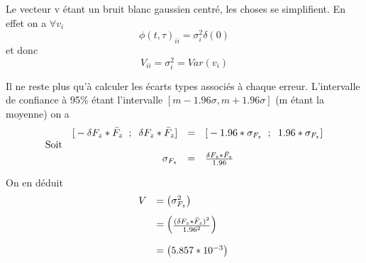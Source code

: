 \documentclass[12pt,twoside,a4paper]{article}
\begin{document}
Le vecteur v étant un bruit blanc gaussien centré, les choses se simplifient. En effet on a $\forall v_{i}$
$$\phi(t,\tau)_{ii} = \sigma_{i}^{2}\delta(0)$$ et donc
$$V_{ii} = \sigma_{i}^{2} = Var(v_{i})$$

Il ne reste plus qu'à calculer les écarts types associés à chaque erreur. L'intervalle de confiance à 95\% étant l'intervalle $[m-1.96\sigma, m+1.96\sigma]$ (m étant la moyenne) on a
$$
\begin{array}{lrcl}
	&\text{[}-\delta F_{z}*\bar{F}_{z} \rule{2mm}{0mm} ; \rule{2mm}{0mm} \delta F_{z}*\bar{F}_{z} \text{]} &=& \text{[} -1.96*\sigma_{F_{z}} \rule{2mm}{0pt}; \rule{2mm}{0pt}1.96*\sigma_{F_{z}}  \text{]} \\
	\text{Soit} & & & \\
	& \sigma_{F_{z}} &=&  \frac{\delta F_{z}*\bar{F}_{z}}{1.96} \\
\end{array}
$$

\vspace{1cm}
On en déduit
$$
\begin{array}{ll}
V &= \begin{pmatrix}
\sigma_{F_{z}}^{2} %
\end{pmatrix} \\
&=  \begin{pmatrix}
\frac{(\delta F_{z}*\bar{F}_{z})^{2}}{1.96^{2}}%
\end{pmatrix} \rule{0pt}{20pt} \\
&= \begin{pmatrix} 5.857*10^{-3} \end{pmatrix} \rule{0pt}{20pt}
\end{array}
$$
\end{document}
